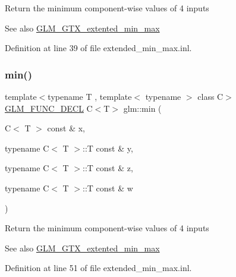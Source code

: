 Return the minimum component-\/wise values of 4 inputs \begin{DoxySeeAlso}{See also}
\mbox{\hyperlink{group__gtx__extented__min__max}{G\+L\+M\+\_\+\+G\+T\+X\+\_\+extented\+\_\+min\+\_\+max}} 
\end{DoxySeeAlso}


Definition at line 39 of file extended\+\_\+min\+\_\+max.\+inl.

\mbox{\label{group__gtx__extented__min__max_ga4fe35dd31dd0c45693c9b60b830b8d47}} 
\subsubsection{\texorpdfstring{min()}{min()}\hspace{0.1cm}{\footnotesize\ttfamily [5/6]}}
{\footnotesize\ttfamily template$<$typename T , template$<$ typename $>$ class C$>$ \\
\mbox{\hyperlink{setup_8hpp_ab2d052de21a70539923e9bcbf6e83a51}{G\+L\+M\+\_\+\+F\+U\+N\+C\+\_\+\+D\+E\+CL}} C$<$T$>$ glm\+::min (\begin{DoxyParamCaption}\item[{C$<$ T $>$ const \&}]{x,  }\item[{typename C$<$ T $>$\+::T const \&}]{y,  }\item[{typename C$<$ T $>$\+::T const \&}]{z,  }\item[{typename C$<$ T $>$\+::T const \&}]{w }\end{DoxyParamCaption})}

Return the minimum component-\/wise values of 4 inputs \begin{DoxySeeAlso}{See also}
\mbox{\hyperlink{group__gtx__extented__min__max}{G\+L\+M\+\_\+\+G\+T\+X\+\_\+extented\+\_\+min\+\_\+max}} 
\end{DoxySeeAlso}


Definition at line 51 of file extended\+\_\+min\+\_\+max.\+inl.

\mbox{\label{group__gtx__extented__min__max_ga7471ea4159eed8dd9ea4ac5d46c2fead}} 
